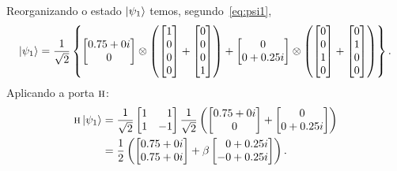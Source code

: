 Reorganizando o estado $\ket{\psi_1}$ temos, segundo~\eqref{eq:psi1},
\begin{equation}
  \ket{\psi_1} = \frac{1}{\sqrt{2}} \left\{ \begin{bmatrix} {0.75+0i} \\ 0 \end{bmatrix} \otimes
    \left(
      \begin{bmatrix} 1 \\ 0 \\ 0 \\ 0 \end{bmatrix} +
      \begin{bmatrix} 0 \\ 0 \\ 0 \\ 1 \end{bmatrix}
    \right) +
    \begin{bmatrix} 0 \\ {0+0.25i} \end{bmatrix} \otimes
    \left(
      \begin{bmatrix} 0 \\ 0 \\ 1 \\ 0 \end{bmatrix} +
      \begin{bmatrix} 0 \\ 1 \\ 0 \\ 0 \end{bmatrix}
    \right) \right\}.
\end{equation}
Aplicando a porta \(\operatorname{\textsc{h}}\):
\begin{equation}
  \label{eq:1}
  \begin{aligned}
    \HAD \ket{\psi_{1}} &= \frac{1}{\sqrt{2}}
                          \begin{bmatrix*}[r] 1 & 1 \\ 1 & -1 \end{bmatrix*}
                          \frac{1}{\sqrt{2}}\left(
                          \begin{bmatrix} {0.75+0i} \\ 0 \end{bmatrix} +
                          \begin{bmatrix} 0 \\ {0+0.25i} \end{bmatrix} \right)\\
                        &= \frac{1}{2} \left(
                          \begin{bmatrix} {0.75+0i} \\ {0.75+0i} \end{bmatrix} +
                          \beta \begin{bmatrix*}[r] {0+0.25i} \\ -{0+0.25i} \end{bmatrix*} \right).
  \end{aligned}
\end{equation}
